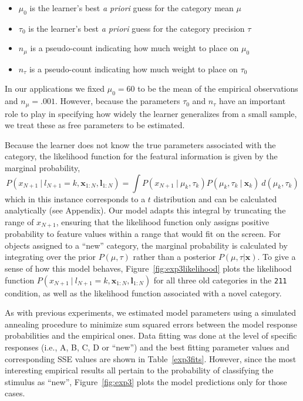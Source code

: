 \documentclass[doc]{apa6}
\newcommand{\given}{\ | \ }
\newcommand{\dist}[1]{\texttt{#1}}
\begin{document}
\begin{itemize}\setlength{\parskip}{0pt}
\item $\mu_0$ is the learner's best {\it a priori} guess for the category mean $\mu$
\item $\tau_0$ is the learner's best {\it a priori} guess for the category precision $\tau$
\item $n_\mu$ is a pseudo-count indicating how much weight to place on $\mu_0$
\item $n_\tau$ is a pseudo-count indicating how much weight to place on $\tau_0$
\end{itemize}
In our applications we fixed $\mu_0=60$ to be the mean of the empirical observations and $n_\mu=.001$. However, because the parameters $\tau_0$ and $n_\tau$ have an important role to play in specifying how widely the learner generalizes from a small sample, we treat these as free parameters to be estimated.

Because the learner does not know the true parameters associated with the category, the likelihood function for the featural information is given by the marginal probability,
\begin{equation}
P(x_{N+1} \given l_{N+1} =k,\bm{x}_{1:N}, \bm{l}_{1:N}) = \int P(x_{N+1} \given \mu_k, \tau_k ) P( \mu_k, \tau_k \given \bm{x}_{k} ) \ d(\mu_k, \tau_k)
\end{equation}
which in this instance corresponds to a $t$ distribution and can be calculated analytically (see Appendix). Our model adapts this integral by truncating the range of $x_{N+1}$, ensuring that the likelihood function only assigns positive probability to feature values within a range that would fit on the screen. For objects assigned to a ``new'' category, the marginal probability is calculated by integrating over the prior $P(\mu,\tau)$ rather than a posterior $P(\mu,\tau | \bm{x})$. To give a sense of how this model behaves, Figure~\ref{fig:exp3likelihood} plots the likelihood function $P(x_{N+1} \given l_{N+1} =k,\bm{x}_{1:N}, \bm{l}_{1:N}) $ for all three old categories in the \dist{211} condition, as well as the likelihood function associated with a novel category.

As with previous experiments, we estimated model parameters using a simulated annealing procedure to minimize sum squared errors between the model response probabilities and the empirical ones. Data fitting was done at the level of specific responses (i.e., A, B, C, D or ``new'') and the best fitting parameter values and corresponding SSE values are shown in Table~\ref{exp3fits}. However, since the most interesting empirical results all pertain to the probability of classifying the stimulus as ``new'', Figure~\ref{fig:exp3} plots the model predictions only for those cases.
\end{document}
